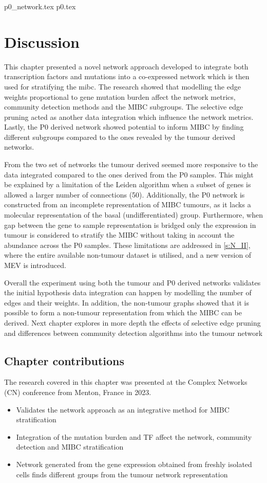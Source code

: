 {p0_network.tex}
{p0.tex}


\section{Discussion}


This chapter presented a novel network approach developed to integrate both transcription factors and mutations into a co-expressed network which is then used for stratifying the \acrlong{mibc}. The research showed that modelling the edge weights proportional to gene mutation burden affect the network metrics, community detection methods and the MIBC subgroups. The selective edge pruning  acted as another data integration which influence the network metrics. Lastly, the P0 derived network showed potential to inform MIBC by finding different subgroups compared to the ones revealed by the tumour derived networks.

From the two set of networks the tumour derived seemed more responsive to the data integrated compared to the ones derived from the P0 samples. This might be explained by a limitation of the Leiden algorithm when a subset of genes is allowed a larger number of connections (50). Additionally, the P0 network is constructed from an incomplete representation of MIBC tumours, as it lacks a molecular representation of the basal (undifferentiated) group. Furthermore, when gap between the gene to sample representation is bridged only the expression in tumour is considered to stratify the MIBC without taking in account the abundance across the P0 samples. These limitations are addressed in \cref{s:N_II}, where the entire available non-tumour dataset is utilised, and a new version of MEV is introduced.


Overall the experiment using both the tumour and P0 derived networks validates the initial hypothesis data integration can happen by modelling the number of edges and their weights. In addition, the non-tumour graphs showed that it is possible to form a non-tumour representation from which the MIBC can be derived. Next chapter explores in more depth the effects of selective edge pruning and differences between community detection algorithms into the tumour network

\subsection{Chapter contributions}

The research covered in this chapter was presented at the Complex Networks (CN) conference from Menton, France in 2023.

\begin{itemize}
    \item Validates the network approach as an integrative method for MIBC stratification
     \item Integration of the mutation burden and TF affect the network, community detection and MIBC stratification
     \item Network generated from the gene expression obtained from freshly isolated cells finds different groups from the tumour network representation
\end{itemize}
